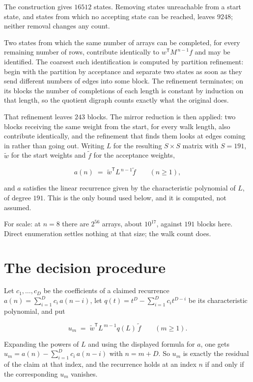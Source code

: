 \documentclass[11pt]{article}
\theoremstyle{definition}
\begin{document}
The construction gives $16512$ states. Removing states unreachable from a start state, and states from which no accepting state can be reached, leaves $9248$; neither removal changes any count.

Two states from which the same number of arrays can be completed, for every remaining number of rows, contribute identically to $w^{\mathsf T}M^{\,n-1}f$ and may be identified. The coarsest such identification is computed by partition refinement: begin with the partition by acceptance and separate two states as soon as they send different numbers of edges into some block. The refinement terminates; on its blocks the number of completions of each length is constant by induction on that length, so the quotient digraph counts exactly what the original does.

That refinement leaves $243$ blocks. The mirror reduction is then applied: two blocks receiving the same weight from the start, for every walk length, also contribute identically, and the refinement that finds them looks at edges coming in rather than going out. Writing $L$ for the resulting $S \times S$ matrix with $S = 191$, $\tilde w$ for the start weights and $\tilde f$ for the acceptance weights,

\[a(n) \;=\; \tilde w^{\mathsf T} L^{\,n-1} \tilde f \qquad (n \ge 1),\]

and $a$ satisfies the linear recurrence given by the characteristic polynomial of $L$, of degree $191$. This is the only bound used below, and it is computed, not assumed.

For scale: at $n = 8$ there are $2^{56}$ arrays, about $10^{17}$, against $191$ blocks here. Direct enumeration settles nothing at that size; the walk count does.

\section{The decision procedure}

Let $c_1,\dots,c_D$ be the coefficients of a claimed recurrence $a(n) = \sum_{i=1}^{D} c_i\,a(n-i)$, let $q(t) = t^{D} - \sum_{i=1}^{D} c_i t^{D-i}$ be its characteristic polynomial, and put

\[u_m \;=\; \tilde w^{\mathsf T} L^{\,m-1} q(L)\,\tilde f \qquad (m \ge 1).\]

Expanding the powers of $L$ and using the displayed formula for $a$, one gets $u_m = a(n) - \sum_{i=1}^{D} c_i\,a(n-i)$ with $n = m + D$. So $u_m$ is exactly the residual of the claim at that index, and the recurrence holds at an index $n$ if and only if the corresponding $u_m$ vanishes.
\end{document}

